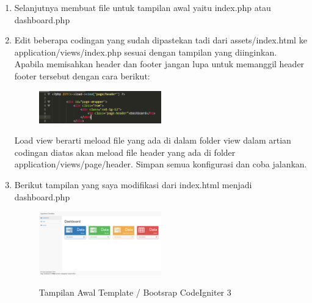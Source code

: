 \begin{enumerate}
	\item Selanjutnya membuat file untuk tampilan awal yaitu index.php atau dashboard.php
	\item Edit beberapa codingan yang sudah dipastekan tadi dari assets/index.html ke application/views/index.php sesuai dengan tampilan yang diinginkan. Apabila memisahkan header dan footer jangan lupa untuk memanggil header footer tersebut dengan cara berikut:
		\begin{figure}[!htbp]
    		\centering
    		\includegraphics[width=0.5\textwidth]{figures/TBCI4.PNG}
    		\label{TBCI4}
		\end{figure}
	    \par Load view berarti meload file yang ada di dalam folder view dalam artian codingan diatas akan meload file header yang ada di folder application/views/page/header. Simpan semua konfigurasi dan coba jalankan.
	    
    \item Berikut tampilan yang saya modifikasi dari index.html menjadi dashboard.php
		\begin{figure}[!htbp]
    		\centering
    		\caption{Tampilan Awal Template / Bootsrap CodeIgniter 3}
    		\includegraphics[width=0.5\textwidth]{figures/TBCI3.png}
    		\label{TBCI3}
		\end{figure}
\end{enumerate}

